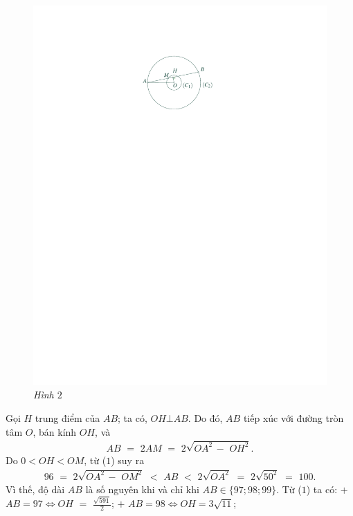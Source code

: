 \begin{multicols}{2}
\begin{figure}[H]
		\includegraphics[width= 1\linewidth]{P663H2}
		\caption{\small\textit{\color{thachthuctoanhoc}Hình $2$}}
		\vspace*{-10pt}
	\end{figure}
	Gọi $H$ trung điểm của $AB$; ta có, $OH \bot AB$. Do đó, $AB$ tiếp xúc với đường tròn tâm $O$, bán kính $OH$, và
	\begin{align*}
		AB\,\, = \,\,2AM\,\, = \,\,2\sqrt {O{A^2}\, - \,\,O{H^2}}. \tag{$1$}
	\end{align*}
	Do $0 < OH < OM$, từ ($1$) suy ra
	\begin{align*}
		96\,\, = \,\,2\sqrt {O{A^2}\, - \,\,O{M^2}} \,\, < \,\,AB\,\, < \,\,2\sqrt {O{A^2}} \,\, = \,\,2\sqrt {{{50}^2}} \,\, = \,\,100. \tag{$1$}
	\end{align*}
	Vì thế, độ dài $AB$ là số nguyên khi và chỉ khi $AB \in \{97; 98; 99\}$.
	\vskip 0.05cm
	Từ ($1$) ta có:
	\vskip 0.05cm
	$+$ $AB = 97  \Leftrightarrow  OH\,\, = \,\,\frac{{\sqrt {591} }}{2}$;
	\vskip 0.05cm
	$+$ $AB = 98  \Leftrightarrow OH = 3\sqrt{11}$;

\end{multicols}
